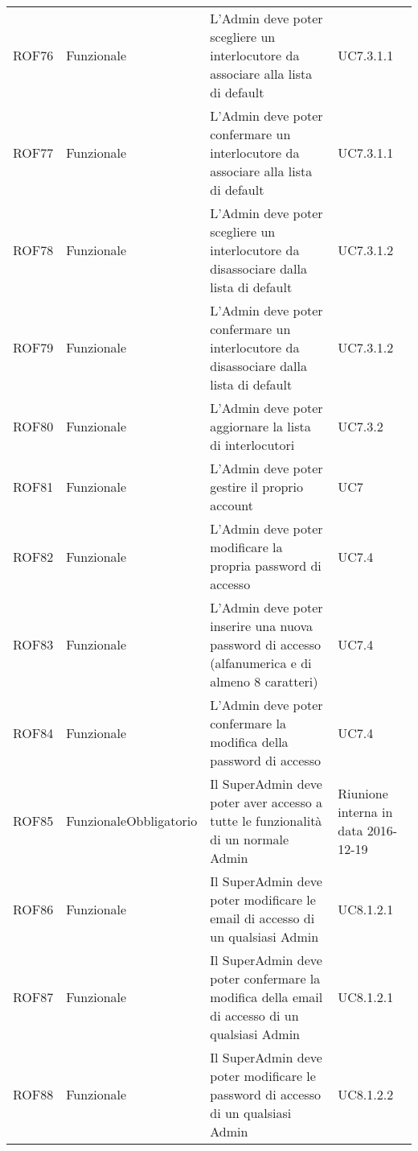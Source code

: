 \documentclass[../AnalisiDeiRequisiti_v4.0.0.tex]{subfiles}
\begin{document}
\begin{longtable}{p{2.5cm}!{\VRule[1pt]}p{2.5cm}!{\VRule[1pt]}p{5cm}!{\VRule[1pt]}p{2.5cm}}
	ROF76&Funzionale\newline  & L'Admin deve poter scegliere un interlocutore da associare alla lista di default & UC7.3.1.1 \\
	ROF77&Funzionale\newline  & L'Admin deve poter confermare un interlocutore da associare alla lista di default & UC7.3.1.1 \\
	ROF78&Funzionale\newline  & L'Admin deve poter scegliere un interlocutore da disassociare dalla lista di default & UC7.3.1.2 \\
	ROF79&Funzionale\newline  & L'Admin deve poter confermare un interlocutore da disassociare dalla lista di default & UC7.3.1.2 \\
	ROF80&Funzionale\newline  & L'Admin deve poter aggiornare la lista di interlocutori & UC7.3.2 \\
	ROF81&Funzionale\newline  & L'Admin deve poter gestire il proprio account & UC7 \\
	ROF82&Funzionale\newline  & L'Admin deve poter modificare la propria password di accesso & UC7.4 \\
	ROF83&Funzionale\newline  & L'Admin deve poter inserire una nuova password di accesso (alfanumerica e di almeno 8 caratteri) & UC7.4 \\
	ROF84&Funzionale\newline  & L'Admin deve poter confermare la modifica della password di accesso & UC7.4 \\
	ROF85&Funzionale\newline Obbligatorio & Il SuperAdmin deve poter aver accesso a tutte le funzionalità di un normale Admin & Riunione interna in data 2016-12-19 \\
	ROF86&Funzionale\newline  & Il SuperAdmin deve poter modificare le email di accesso di un qualsiasi Admin & UC8.1.2.1 \\
	ROF87&Funzionale\newline  & Il SuperAdmin deve poter confermare la modifica della email di accesso di un qualsiasi Admin & UC8.1.2.1 \\
	ROF88&Funzionale\newline  & Il SuperAdmin deve poter modificare le password di accesso di un qualsiasi Admin & UC8.1.2.2 \\

\end{longtable}
\end{document}
